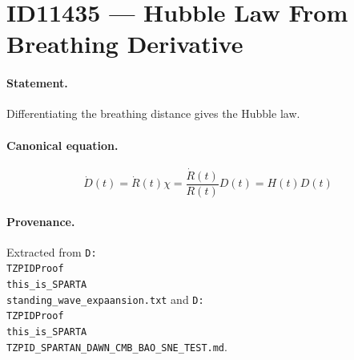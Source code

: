 \section*{ID11435 --- Hubble Law From Breathing Derivative}

\paragraph{Statement.}
Differentiating the breathing distance gives the Hubble law.

\paragraph{Canonical equation.}
\[
\dot D(t)=\dot R(t)\chi=\frac{\dot R(t)}{R(t)}D(t)=H(t)D(t)
\]

\paragraph{Provenance.}
Extracted from \texttt{D:\\TZPIDProof\\this\_is\_SPARTA\\standing\_wave\_expaansion.txt} and \texttt{D:\\TZPIDProof\\this\_is\_SPARTA\\TZPID\_SPARTAN\_DAWN\_CMB\_BAO\_SNE\_TEST.md}.
